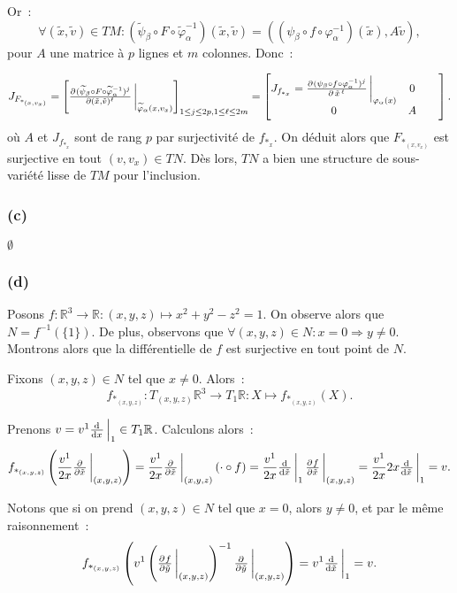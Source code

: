 \documentclass{article}
\newcommand{\R}{\mathbb R}
\begin{document}
Or~:
\[\forall (\tilde x, \tilde v) \in TM : (\widetilde \psi_\beta \circ F \circ \widetilde \varphi_\alpha^{-1})(\tilde x, \tilde v)
	= ((\psi_\beta \circ f \circ \varphi_\alpha^{-1})(\tilde x), A\tilde v),\]
pour $A$ une matrice à $p$ lignes et $m$ colonnes. Donc~:

\[J_{F_{*_{(x, v_x)}}} = \left[\pd {(\widetilde \psi_\beta \circ F \circ \widetilde \varphi_\alpha^{-1})^j}
            {{(\tilde x, \tilde v)^\ell}}\sVert[3]_{\widetilde \varphi_\alpha(x, v_x)}\right]_{1 \leq j \leq 2p, 1 \leq \ell \leq 2m}
	= \begin{bmatrix}
			J_{f_{*_x}} = \pd {(\psi_\beta \circ f \circ \varphi_\alpha^{-1})^j}{{\left.\tilde x\right.^\ell}}\sVert[3]_{\varphi_\alpha(x)} & 0 \qquad \\
			0 & A\qquad
		\end{bmatrix}.
\]
où $A$ et $J_{f_{*_x}}$ sont de rang $p$ par surjectivité de $f_{*_x}$. On déduit alors que $F_{*_{(x, v_x)}}$ est surjective en tout $(v, v_x) \in TN$.
Dès lors, $TN$ a bien une structure de sous-variété lisse de $TM$ pour l'inclusion.

\subsubsection*{(c)}
$\emptyset$

\subsubsection*{(d)}
Posons $f : \R^3 \to \R : (x, y, z) \mapsto x^2 + y^2 - z^2 = 1$. On observe alors que $N = f^{-1}(\{1\})$. De plus, observons que $\forall (x, y, z) \in N :
x = 0 \Rightarrow y \neq 0$. Montrons alors que la différentielle de $f$ est surjective en tout point de $N$.

Fixons $(x, y, z) \in N$ tel que $x \neq 0$. Alors~:
\[f_{*_{(x, y, z)}} : T_{(x, y, z)}\R^3 \to T_1\R : X \mapsto f_{*_{(x, y, z)}}(X).\]

Prenons $v = v^1\od {}{x}\sVert[2]_1 \in T_1\R$. Calculons alors~:
\[f_{*_{(x, y, z)}}\left(\frac {v^1}{2x}\pd {}{\tilde x}\sVert[3]_{(x, y, z)}\right) = \frac {v^1}{2x}\pd {}{\tilde x}\sVert[3]_{(x, y, z)}(\cdot \circ f)
	= \frac {v^1}{2x}\od {}{\tilde x}\sVert[3]_1\pd f{\tilde x}\sVert[3]_{(x, y, z)} = \frac {v^1}{2x}2x\od {}{\tilde x}\sVert[3]_1 = v.\]

Notons que si on prend $(x, y, z) \in N$ tel que $x = 0$, alors $y \neq 0$, et par le même raisonnement~:
\[f_{*_{(x, y, z)}}\left(v^1\left(\pd f{\tilde y}\sVert[3]_{(x, y, z)}\right)^{-1}\pd {}{\tilde y}\sVert[3]_{(x, y, z)}\right) = v^1\od {}{\tilde x}\sVert[3]_1 = v.\]
\end{document}
